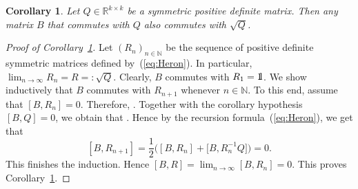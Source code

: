 \documentclass[pdftex]{sigma}
\numberwithin{equation}{section}
\newtheorem{Corollary}[Theorem]{Corollary}
\newcommand{\N}{{\mathbb{N}}}
\newcommand{\R}{{\mathbb{R}}}
\newcommand{\1}{{{\mathchoice {\rm 1\mskip-4mu l} {\rm 1\mskip-4mu l}
{\rm 1\mskip-4.5mu l} {\rm 1\mskip-5mu l}}}}
\begin{document}
\begin{Corollary}\label{cor:Heron}
Let $Q\in\R^{k\times k}$ be a symmetric positive definite matrix.
Then any matrix $B$ that commutes with $Q$ also commutes with $\sqrt{Q}$.
\end{Corollary}

\begin{proof}[Proof of Corollary~\ref{cor:Heron}]
Let $(R_n)_{n\in\N}$ be the sequence of positive definite symmetric
matrices defined by~(\ref{eq:Heron}).
In particular, $\lim_{n\to\infty} R_n=R=: \sqrt{Q}$.
Clearly, $B$ commutes with $R_1=\1$.
We show inductively that $B$ commutes with $R_{n+1}$ whenever $n\in\N$.
To this end, assume that $[B,R_n]=0$.
Therefore, .
Together with the corollary hypothesis $[B,Q]=0$, we obtain that
.
Hence by the recursion formula~(\ref{eq:Heron}),
we get that
\[
[B,R_{n+1}]=\frac12 \bigl([B,R_n]+\bigl[B,R_n^{-1} Q\bigr] \bigr)=0.
\]
This finishes the induction.
Hence ${[B,R]=\lim_{n\to\infty}[B,R_n]=0}$.
This proves Corollary~\ref{cor:Heron}.
\end{proof}
\end{document}

